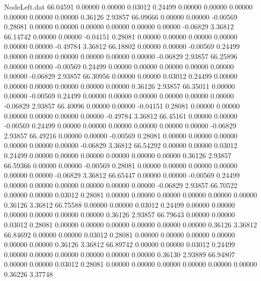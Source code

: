 \begin{filecontents}{NodeLeft.dat}
  66.04591    0.00000    0.00000     0.03012    0.24499    0.00000    0.00000    0.00000    0.00000    0.00000    0.00000    0.36126    2.93857
  66.09666    0.00000    0.00000    -0.00569    0.28081    0.00000    0.00000    0.00000    0.00000    0.00000    0.00000   -0.06829    3.36812
  66.14742    0.00000    0.00000    -0.04151    0.28081    0.00000    0.00000    0.00000    0.00000    0.00000    0.00000   -0.49784    3.36812
  66.18802    0.00000    0.00000    -0.00569    0.24499    0.00000    0.00000    0.00000    0.00000    0.00000    0.00000   -0.06829    2.93857
  66.25896    0.00000    0.00000    -0.00569    0.24499    0.00000    0.00000    0.00000    0.00000    0.00000    0.00000   -0.06829    2.93857
  66.30956    0.00000    0.00000     0.03012    0.24499    0.00000    0.00000    0.00000    0.00000    0.00000    0.00000    0.36126    2.93857
  66.35011    0.00000    0.00000    -0.00569    0.24499    0.00000    0.00000    0.00000    0.00000    0.00000    0.00000   -0.06829    2.93857
  66.40096    0.00000    0.00000    -0.04151    0.28081    0.00000    0.00000    0.00000    0.00000    0.00000    0.00000   -0.49784    3.36812
  66.45161    0.00000    0.00000    -0.00569    0.24499    0.00000    0.00000    0.00000    0.00000    0.00000    0.00000   -0.06829    2.93857
  66.49216    0.00000    0.00000    -0.00569    0.28081    0.00000    0.00000    0.00000    0.00000    0.00000    0.00000   -0.06829    3.36812
  66.54292    0.00000    0.00000     0.03012    0.24499    0.00000    0.00000    0.00000    0.00000    0.00000    0.00000    0.36126    2.93857
  66.59366    0.00000    0.00000    -0.00569    0.28081    0.00000    0.00000    0.00000    0.00000    0.00000    0.00000   -0.06829    3.36812
  66.65447    0.00000    0.00000    -0.00569    0.24499    0.00000    0.00000    0.00000    0.00000    0.00000    0.00000   -0.06829    2.93857
  66.70522    0.00000    0.00000     0.03012    0.28081    0.00000    0.00000    0.00000    0.00000    0.00000    0.00000    0.36126    3.36812
  66.75588    0.00000    0.00000     0.03012    0.24499    0.00000    0.00000    0.00000    0.00000    0.00000    0.00000    0.36126    2.93857
  66.79643    0.00000    0.00000     0.03012    0.28081    0.00000    0.00000    0.00000    0.00000    0.00000    0.00000    0.36126    3.36812
  66.84692    0.00000    0.00000     0.03012    0.28081    0.00000    0.00000    0.00000    0.00000    0.00000    0.00000    0.36126    3.36812
  66.89742    0.00000    0.00000     0.03012    0.24499    0.00000    0.00000    0.00000    0.00000    0.00000    0.00000    0.36130    2.93889
  66.94807    0.00000    0.00000     0.03012    0.28081    0.00000    0.00000    0.00000    0.00000    0.00000    0.00000    0.36226    3.37748

\end{filecontents}
